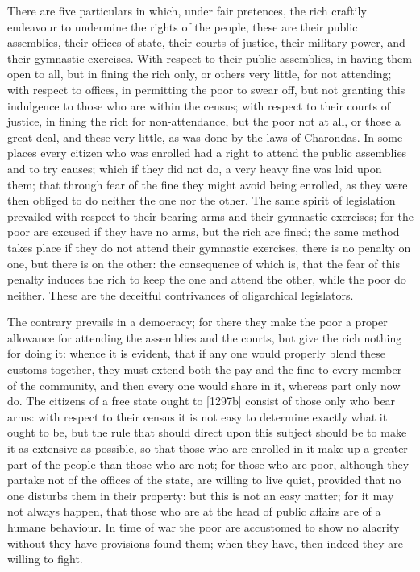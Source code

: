 
There are five particulars in which, under fair pretences, the rich
craftily endeavour to undermine the rights of the people, these are their
public assemblies, their offices of state, their courts of justice, their
military power, and their gymnastic exercises. With respect to their
public assemblies, in having them open to all, but in fining the rich
only, or others very little, for not attending; with respect to offices,
in permitting the poor to swear off, but not granting this indulgence to
those who are within the census; with respect to their courts of justice,
in fining the rich for non-attendance, but the poor not at all, or those a
great deal, and these very little, as was done by the laws of Charondas.
In some places every citizen who was enrolled had a right to attend the
public assemblies and to try causes; which if they did not do, a very
heavy fine was laid upon them; that through fear of the fine they might
avoid being enrolled, as they were then obliged to do neither the one nor
the other. The same spirit of legislation prevailed with respect to their
bearing arms and their gymnastic exercises; for the poor are excused if
they have no arms, but the rich are fined; the same method takes place if
they do not attend their gymnastic exercises, there is no penalty on one,
but there is on the other: the consequence of which is, that the fear of
this penalty induces the rich to keep the one and attend the other, while
the poor do neither. These are the deceitful contrivances of oligarchical
legislators.

The contrary prevails in a democracy; for there they make the poor a
proper allowance for attending the assemblies and the courts, but give the
rich nothing for doing it: whence it is evident, that if any one would
properly blend these customs together, they must extend both the pay and
the fine to every member of the community, and then every one would share
in it, whereas part only now do. The citizens of a free state ought to
[1297b] consist of those only who bear arms: with respect to their census
it is not easy to determine exactly what it ought to be, but the rule that
should direct upon this subject should be to make it as extensive as
possible, so that those who are enrolled in it make up a greater part of
the people than those who are not; for those who are poor, although they
partake not of the offices of the state, are willing to live quiet,
provided that no one disturbs them in their property: but this is not an
easy matter; for it may not always happen, that those who are at the head
of public affairs are of a humane behaviour. In time of war the poor are
accustomed to show no alacrity without they have provisions found them;
when they have, then indeed they are willing to fight.

